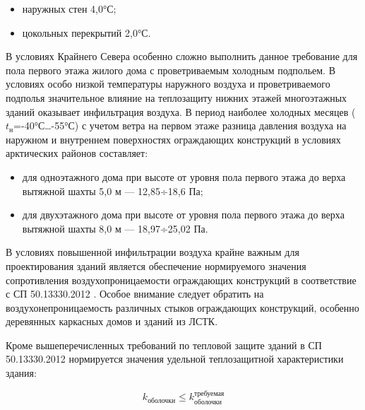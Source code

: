 \begin{itemize}
    \item наружных стен 4,0°С;
    \item цокольных перекрытий 2,0°С.
\end{itemize}

В условиях Крайнего Севера особенно сложно выполнить данное требование для пола первого этажа жилого дома с проветриваемым холодным подпольем.
В условиях особо низкой температуры наружного воздуха и проветриваемого подполья значительное влияние на теплозащиту нижних этажей
многоэтажных зданий оказывает инфильтрация воздуха. В период наиболее холодных месяцев ($t_\text{н}$=-40°С…-55°С) с учетом ветра
на первом этаже разница давления воздуха на наружном и внутреннем поверхностях ограждающих конструкций в условиях арктических районов составляет:
\begin{itemize}
    \item для одноэтажного дома при высоте от уровня пола первого этажа до верха вытяжной шахты 5,0 м --- 12,85÷18,6 Па;
    \item для двухэтажного дома при высоте от уровня пола первого этажа до верха вытяжной шахты 8,0 м --- 18,97÷25,02 Па.
\end{itemize}






В условиях повышенной инфильтрации воздуха крайне важным для проектирования зданий является обеспечение
нормируемого значения сопротивления воздухопроницаемости ограждающих конструкций в соответствие с СП 50.13330.2012 \cite{law_RU_Rules_Code_ThermalPerformance}.
Особое внимание следует обратить на воздухонепроницаемость различных стыков ограждающих конструкций, особенно деревянных каркасных домов и зданий из ЛСТК.

Кроме вышеперечисленных требований по тепловой защите зданий в СП 50.13330.2012 \cite{law_RU_Rules_Code_ThermalPerformance}
нормируется значения удельной теплозащитной характеристики здания: %
\begin{eqndesc}
    \begin{equation}\label{eq:heatprotectequal}
        k_\text{оболочки}   \leqslant   k_\text{оболочки}^\text{требуемая}
    \end{equation}

\end{eqndesc}

